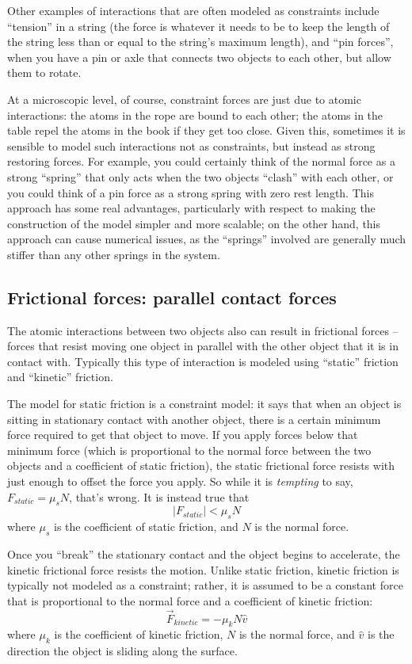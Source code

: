 Other examples of interactions that are often modeled as constraints include ``tension'' in a string (the force is whatever it needs to be to keep the length of the string less than or equal to the string's maximum length), and ``pin forces'', when you have a pin or axle that connects two objects to each other, but allow them to rotate.  

At a microscopic level, of course, constraint forces are just due to atomic interactions:  the atoms in the rope are bound to each other; the atoms in the table repel the atoms in the book if they get too close.  Given this, sometimes it is sensible to model such interactions not as constraints, but instead as strong restoring forces.  For example, you could certainly think of the normal force as a strong ``spring'' that only acts when the two objects ``clash'' with each other, or you could think of a pin force as a strong spring with zero rest length. This approach has some real advantages, particularly with respect to making the construction of the model simpler and more scalable; on the other hand, this approach can cause numerical issues, as the ``springs'' involved are generally much stiffer than any other springs in the system.

\subsection{Frictional forces: parallel contact forces}
The atomic interactions between two objects also can result in frictional forces -- forces that resist moving one object in parallel with the other object that it is in contact with.  Typically this type of interaction is modeled using ``static'' friction and ``kinetic'' friction.

The model for static friction is a constraint model:  it says that when an object is sitting in stationary contact with another object, there is a certain minimum force required to get that object to move.  If you apply forces below that minimum force (which is proportional to the normal force between the two objects and a coefficient of static friction), the static frictional force resists with just enough to offset the force you apply. So while it is {\it tempting} to say, $F_{static} = \mu_s N$, that's wrong.  It is instead true that $$|F_{static}| < \mu_s N$$
where $\mu_s$ is the coefficient of static friction, and $N$ is the normal force.

Once you ``break'' the stationary contact and the object begins to accelerate, the kinetic frictional force resists the motion.  Unlike static friction, kinetic friction is typically not modeled as a constraint; rather, it is assumed to be a constant force that is proportional to the normal force and a coefficient of kinetic friction:
$$\vec{F}_{kinetic} = - \mu_k N \hat{v}$$
where $\mu_k$ is the coefficient of kinetic friction, $N$ is the normal force, and $\hat{v}$ is the direction the object is sliding along the surface.


